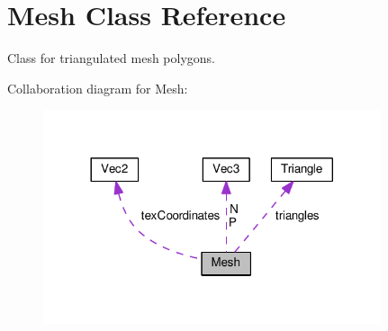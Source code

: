 \hypertarget{class_mesh}{}\section{Mesh Class Reference}
\label{class_mesh}


Class for triangulated mesh polygons.  




Collaboration diagram for Mesh\+:
\nopagebreak
\begin{figure}[H]
\begin{center}
\leavevmode
\includegraphics[width=281pt]{class_mesh__coll__graph}
\end{center}
\end{figure}
